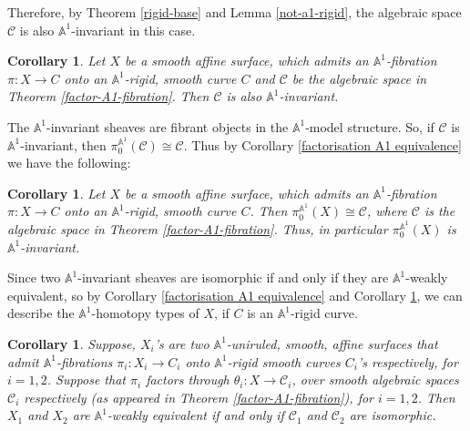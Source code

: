 \documentclass[11pt, reqno]{amsart}
\theoremstyle{plain}
\newtheorem{corollary}[thm]{Corollary}
\theoremstyle{definition}
\newcommand{\sC}{{\mathcal C}}
\newcommand{\A}{{\mathbb A}}
\begin{document}
Therefore, by Theorem \ref{rigid-base} and Lemma \ref{not-a1-rigid}, the algebraic space $\sC$ is also $\A^1$-invariant in this case.
\begin{corollary} \label{a1 invariance of algebraic space}
Let $X$ be a smooth affine surface, which admits an $\mathbb{A}^1$-fibration $\pi: X \to C$ onto an  
$\A^1$-rigid, smooth curve $C$ and
$\sC$ be the algebraic space 
in Theorem \ref{factor-A1-fibration}. Then $\sC$ is also $\A^1$-invariant.
\end{corollary}
The $\A^1$-invariant sheaves are fibrant objects in the $\A^1$-model structure. So, if $\sC$ is $\A^1$-invariant, then $\pi_0^{\A^1}(\sC) \cong \sC$. Thus by Corollary \ref{factorisation A1 equivalence} we have the following:
\begin{corollary} \label{rigid case a1 invariant}
Let $X$ be a smooth affine surface, which admits an $\mathbb{A}^1$-fibration $\pi: X \to C$ onto an  
$\A^1$-rigid, smooth curve $C$. Then $\pi_0^{\A^1}(X) \cong \sC$, where $\sC$ is the algebraic space in Theorem \ref{factor-A1-fibration}. Thus, in particular $\pi_0^{\A^1}(X)$ is $\A^1$-invariant.
\end{corollary}
Since two $\A^1$-invariant sheaves are isomorphic if and only if they are $\A^1$-weakly equivalent, so by
Corollary \ref{factorisation A1 equivalence} and Corollary \ref{a1 invariance of algebraic space}, we can describe the $\A^1$-homotopy types of $X$, if $C$ is an $\A^1$-rigid curve.
\begin{corollary} \label{homotopy types base rigid}
Suppose, $X_i$'s are two $\A^1$-uniruled, smooth, affine surfaces that admit $\A^1$-fibrations $\pi_i: X_i \to C_i$
onto $\A^1$-rigid smooth curves $C_i$'s respectively, for $i=1,2$. Suppose that $\pi_i$ factors through $\theta_i: X \to \sC_i$, over smooth algebraic spaces $\sC_i$ respectively (as appeared in Theorem \ref{factor-A1-fibration}), for $i=1,2$.
Then $X_1$ and $X_2$ are $\A^1$-weakly equivalent if and only if $\sC_1$ and $\sC_2$ are isomorphic.
\end{corollary}
\end{document}
